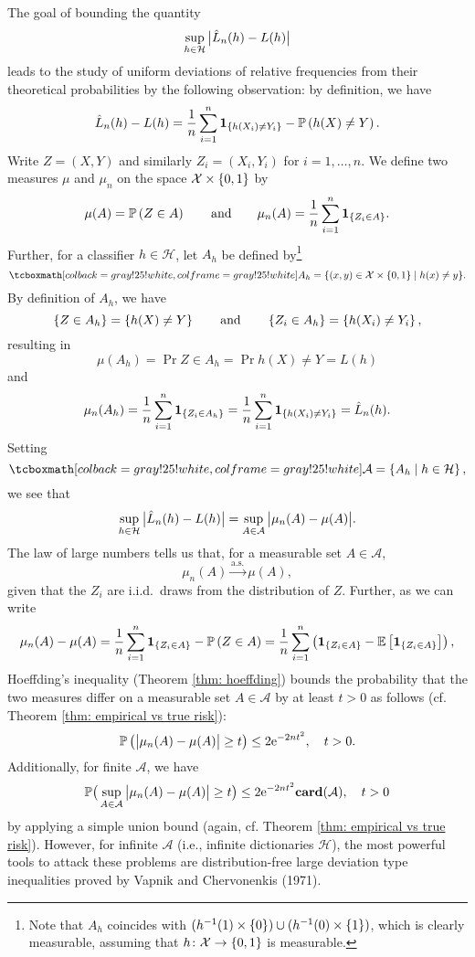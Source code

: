 The goal of bounding the quantity
\[
    \sup_{h \in \mathcal{H}} \big\lvert \hat L_n(h) - L(h) \big\rvert
\]
leads to the study of uniform deviations of relative frequencies from their theoretical probabilities by the following observation: by definition, we have
\[
    \hat L_n(h) - L(h) = \frac{1}{n} \sum_{i=1}^n \mathbf{1}_{\left\{h(X_i) \neq Y_i\right\}} - \mathbb{P}\left(h(X) \neq Y\right).
\]
Write $Z = (X, Y)$ and similarly $Z_i = (X_i, Y_i)$ for $i = 1, \dots, n$. We define two measures $\mu$ and $\mu_n$ on the space $\mathcal{X} \times \left\{0, 1\right\}$ by
\[
    \mu(A) = \mathbb{P}\left(Z \in A\right) \qquad \text{and} \qquad \mu_n(A) = \frac{1}{n} \sum_{i=1}^n \mathbf{1}_{\left\{Z_i \in A\right\}}.
\]
Further, for a classifier $h \in \mathcal{H}$, let $A_h$ be defined by\footnote{Note that $A_h$ coincides with $(h^{-1}(1) \times \left\{0\right\}) \cup (h^{-1}(0) \times \left\{1\right\})$, which is clearly measurable, assuming that $h \colon \mathcal{X} \to \left\{0, 1\right\}$ is measurable.}
\begin{equation}
\label{eq: sets A_h}
    \highlightMath{
        A_h = \{ (x, y) \in \mathcal{X} \times \set{0, 1} \with h(x) \neq y \}.
    }
\end{equation}
By definition of $A_h$, we have
\[
    \left\{Z \in A_h\right\} = \left\{h(X) \neq Y\right\} \qquad \text{and} \qquad \left\{Z_i \in A_h\right\} = \left\{h(X_i) \neq Y_i\right\},
\]
resulting in
\[
    \mu(A_h) = \Pr{Z \in A_h} = \Pr{h(X) \neq Y} = L(h)
\]
and
\[
    \mu_n(A_h) = \frac{1}{n} \sum_{i=1}^n \mathbf{1}_{\left\{Z_i \in A_h\right\}} = \frac{1}{n} \sum_{i=1}^n \mathbf{1}_{\left\{h(X_i) \neq Y_i\right\}} = \hat L_n(h).
\]
Setting
\begin{equation}
\label{eq: collection of sets A_h}
    \highlightMath{
        \mathcal{A} = \set{A_h \with h \in \mathcal{H}},
    }
\end{equation}
we see that
\[
    \sup_{h \in \mathcal{H}} \big\lvert \hat L_n(h) - L(h) \big\rvert = \sup_{A \in \mathcal{A}} \big\lvert \mu_n(A) - \mu(A) \big\rvert.
\]
The law of large numbers tells us that, for a measurable set $A \in \mathcal{A}$,
\[
    \mu_n(A) \xrightarrow{\mathrm{a.s.}} \mu(A),
\]
given that the $Z_i$ are i.i.d.\ draws from the distribution of $Z$. Further, as we can write
\[
    \mu_n(A) - \mu(A) = \frac{1}{n} \sum_{i=1}^n \mathbf{1}_{\left\{Z_i \in A\right\}} - \mathbb{P}\left(Z \in A\right) = \frac{1}{n} \sum_{i=1}^n \left( \mathbf{1}_{\left\{Z_i \in A\right\}} - \mathbb{E}\left[\mathbf{1}_{\left\{Z_i \in A\right\}}\right] \right),
\]
Hoeffding's inequality (Theorem \ref{thm: hoeffding}) bounds the probability that the two measures differ on a measurable set $A \in \mathcal{A}$ by at least $t > 0$ as follows (cf. Theorem \ref{thm: empirical vs true risk}):
\[
    \mathbb{P}\left(\big\lvert \mu_n(A) - \mu(A) \big\rvert \geq t\right) \leq 2\mathrm{e}^{-2nt^2}, \quad t > 0.
\]
Additionally, for finite $\mathcal{A}$, we have
\[
    \mathbb{P}\big( \sup_{A \in \mathcal{A}} \big\lvert \mu_n(A) - \mu(A) \big\rvert \geq t \big) \leq 2\mathrm{e}^{-2nt^2} \mathrm{\mathbf{card}}(\mathcal{A}), \quad t > 0
\]
by applying a simple union bound (again, cf. Theorem \ref{thm: empirical vs true risk}). However, for infinite $\mathcal{A}$ (i.e., infinite dictionaries $\mathcal{H}$), the most powerful tools to attack these problems are distribution-free large deviation type inequalities proved by Vapnik and Chervonenkis (1971).

